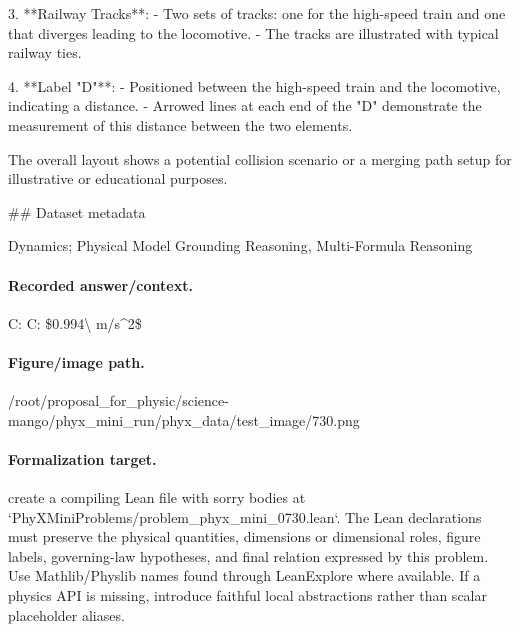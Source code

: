 3. **Railway Tracks**:
   - Two sets of tracks: one for the high-speed train and one that diverges leading to the locomotive.
   - The tracks are illustrated with typical railway ties.

4. **Label "D"**:
   - Positioned between the high-speed train and the locomotive, indicating a distance.
   - Arrowed lines at each end of the "D" demonstrate the measurement of this distance between the two elements.

The overall layout shows a potential collision scenario or a merging path setup for illustrative or educational purposes.

\#\# Dataset metadata

Dynamics; Physical Model Grounding Reasoning, Multi-Formula Reasoning

\paragraph{Recorded answer/context.}
C: C: \$0.994\textbackslash{} m/s\textasciicircum{}2\$

\paragraph{Figure/image path.}
/root/proposal\_for\_physic/science-mango/phyx\_mini\_run/phyx\_data/test\_image/730.png

\paragraph{Formalization target.}
create a compiling Lean file with sorry bodies at `PhyXMiniProblems/problem\_phyx\_mini\_0730.lean`. The Lean declarations must preserve the physical quantities, dimensions or dimensional roles, figure labels, governing-law hypotheses, and final relation expressed by this problem.
Use Mathlib/Physlib names found through LeanExplore where available. If a physics API is missing, introduce faithful local abstractions rather than scalar placeholder aliases.

